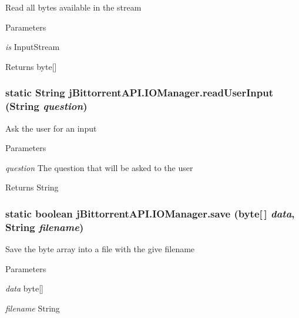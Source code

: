 \label{classj_bittorrent_a_p_i_1_1_i_o_manager_a5e79391798ed25d06a99845b7ea4a8c1}
Read all bytes available in the stream 
\begin{DoxyParams}{Parameters}
\item[{\em is}]InputStream \end{DoxyParams}
\begin{DoxyReturn}{Returns}
byte\mbox{[}\mbox{]} 
\end{DoxyReturn}
\hypertarget{classj_bittorrent_a_p_i_1_1_i_o_manager_ae3ba74957fe0fb4a5087c35618e5cfc9}{
\subsubsection[{readUserInput}]{\setlength{\rightskip}{0pt plus 5cm}static String jBittorrentAPI.IOManager.readUserInput (String {\em question})}}
\label{classj_bittorrent_a_p_i_1_1_i_o_manager_ae3ba74957fe0fb4a5087c35618e5cfc9}
Ask the user for an input 
\begin{DoxyParams}{Parameters}
\item[{\em question}]The question that will be asked to the user \end{DoxyParams}
\begin{DoxyReturn}{Returns}
String 
\end{DoxyReturn}
\hypertarget{classj_bittorrent_a_p_i_1_1_i_o_manager_aa6793b275ebb45b76d445296b0e296e9}{
\subsubsection[{save}]{\setlength{\rightskip}{0pt plus 5cm}static boolean jBittorrentAPI.IOManager.save (byte\mbox{[}$\,$\mbox{]} {\em data}, \/  String {\em filename})}}
\label{classj_bittorrent_a_p_i_1_1_i_o_manager_aa6793b275ebb45b76d445296b0e296e9}
Save the byte array into a file with the give filename 
\begin{DoxyParams}{Parameters}
\item[{\em data}]byte\mbox{[}\mbox{]} \item[{\em filename}]String \end{DoxyParams}
